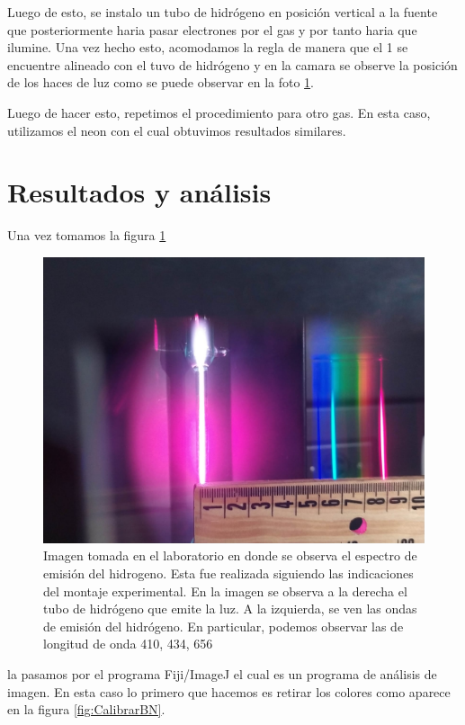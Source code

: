 \documentclass[a4paper, amsfonts, amssymb, amsmath, reprint, showkeys, nofootinbib, twoside]{revtex4-1}
\begin{document}
Luego de esto, se instalo un tubo de hidrógeno en posición vertical a la fuente que posteriormente haria pasar electrones por el gas y por tanto haria que ilumine.  Una vez hecho esto, acomodamos la regla de manera que el 1 se encuentre alineado con el tuvo de hidrógeno y en la camara se observe la posición de los haces de luz como se puede observar en la foto \ref{fig:calibrar}.

Luego de hacer esto, repetimos el procedimiento para otro gas. En esta caso, utilizamos el neon con el cual obtuvimos resultados similares.

\section{Resultados y análisis}

Una vez tomamos la figura \ref{fig:calibrar}
\begin{figure}[H]
    \centering
    \includegraphics[scale=0.1]{Hidrogeno_Zoom.jpeg}
    \caption{Imagen tomada en el laboratorio en donde se observa el espectro de emisión del hidrogeno. Esta fue realizada siguiendo las indicaciones del montaje experimental. En la imagen se observa a la derecha el tubo de hidrógeno que emite la luz. A la izquierda, se ven las ondas de emisión del hidrógeno. En particular, podemos observar las de longitud de onda 410, 434, 656}
    \label{fig:calibrar}
\end{figure}
 la pasamos por el programa Fiji/ImageJ el cual es un programa de análisis de imagen. En esta caso lo primero que hacemos es retirar los colores como aparece en la figura \ref{fig:CalibrarBN}. 
\end{document}
